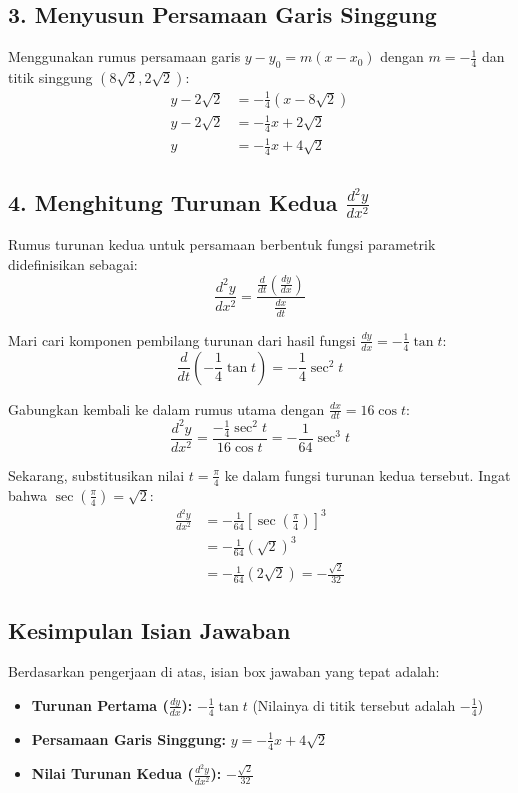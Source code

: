 \documentclass[12pt,a4paper]{article}
\begin{document}
\subsection*{3. Menyusun Persamaan Garis Singgung}
Menggunakan rumus persamaan garis $y - y_0 = m(x - x_0)$ dengan $m = -\frac{1}{4}$ dan titik singgung $\left(8\sqrt{2}, 2\sqrt{2}\right)$:
\begin{align*}
  y - 2\sqrt{2} &= -\frac{1}{4}\left(x - 8\sqrt{2}\right) \\
  y - 2\sqrt{2} &= -\frac{1}{4}x + 2\sqrt{2} \\
  y &= -\frac{1}{4}x + 4\sqrt{2}
\end{align*}

\subsection*{4. Menghitung Turunan Kedua $\frac{d^2y}{dx^2}$}
Rumus turunan kedua untuk persamaan berbentuk fungsi parametrik didefinisikan sebagai:
\begin{equation*}
  \frac{d^2y}{dx^2} = \frac{\frac{d}{dt}\left(\frac{dy}{dx}\right)}{\frac{dx}{dt}}
\end{equation*}

Mari cari komponen pembilang turunan dari hasil fungsi $\frac{dy}{dx} = -\frac{1}{4}\tan t$:
\begin{equation*}
  \frac{d}{dt}\left(-\frac{1}{4}\tan t\right) = -\frac{1}{4}\sec^2 t
\end{equation*}

Gabungkan kembali ke dalam rumus utama dengan $\frac{dx}{dt} = 16\cos t$:
\begin{equation*}
  \frac{d^2y}{dx^2} = \frac{-\frac{1}{4}\sec^2 t}{16\cos t} = -\frac{1}{64}\sec^3 t
\end{equation*}

Sekarang, substitusikan nilai $t = \frac{\pi}{4}$ ke dalam fungsi turunan kedua tersebut. Ingat bahwa $\sec\left(\frac{\pi}{4}\right) = \sqrt{2}$:
\begin{align*}
  \frac{d^2y}{dx^2} &= -\frac{1}{64} \left[\sec\left(\frac{\pi}{4}\right)\right]^3 \\
  &= -\frac{1}{64} (\sqrt{2})^3 \\
  &= -\frac{1}{64} (2\sqrt{2}) = -\frac{\sqrt{2}}{32}
\end{align*}

\subsection*{Kesimpulan Isian Jawaban}
Berdasarkan pengerjaan di atas, isian box jawaban yang tepat adalah:
\begin{itemize}
  \item \textbf{Turunan Pertama ($\frac{dy}{dx}$):} $-\frac{1}{4}\tan t$ \quad (Nilainya di titik tersebut adalah $-\frac{1}{4}$)
  \item \textbf{Persamaan Garis Singgung:} $y = -\frac{1}{4}x + 4\sqrt{2}$
  \item \textbf{Nilai Turunan Kedua ($\frac{d^2y}{dx^2}$):} $-\frac{\sqrt{2}}{32}$
\end{itemize}
\end{document}
